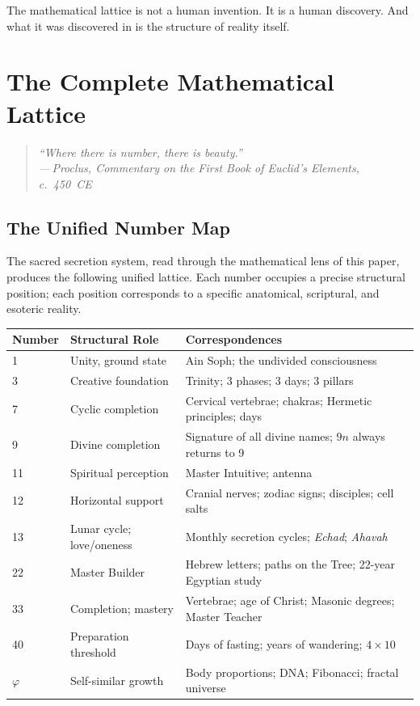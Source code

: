 \documentclass[12pt, a4paper]{article}
\newcommand{\epigraph}[2]{%
  \begin{quote}
    \itshape ``#1''\\[0.3em]
    \normalfont\small\hfill ---\,#2
  \end{quote}
}
\begin{document}
The mathematical lattice is not a human invention. It is a human discovery.
And what it was discovered in is the structure of reality itself.

\section{The Complete Mathematical Lattice}
\label{sec:lattice}

\epigraph{Where there is number, there is beauty.}{Proclus, \emph{Commentary
on the First Book of Euclid's Elements}, c.~450~CE}

\subsection{The Unified Number Map}

The sacred secretion system, read through the mathematical lens of this paper,
produces the following unified lattice. Each number occupies a precise
structural position; each position corresponds to a specific anatomical,
scriptural, and esoteric reality.

\begin{center}
\begin{tabular}{C{1.5cm} C{4cm} C{6.5cm}}
\toprule
\textbf{Number} & \textbf{Structural Role} & \textbf{Correspondences} \\
  & Unity, ground state & Ain Soph; the undivided consciousness \\
3  & Creative foundation & Trinity; 3 phases; 3 days; 3 pillars \\
7  & Cyclic completion & Cervical vertebrae; chakras; Hermetic principles; days \\
9  & Divine completion & Signature of all divine names; $9n$ always returns to 9 \\
11 & Spiritual perception & Master Intuitive; antenna \\
12 & Horizontal support & Cranial nerves; zodiac signs; disciples; cell salts \\
13 & Lunar cycle; love/oneness & Monthly secretion cycles; \emph{Echad}; \emph{Ahavah} \\
22 & Master Builder & Hebrew letters; paths on the Tree; 22-year Egyptian study \\
33 & Completion; mastery & Vertebrae; age of Christ; Masonic degrees; Master Teacher \\
40 & Preparation threshold & Days of fasting; years of wandering; $4 \times 10$ \\
$\varphi$ & Self-similar growth & Body proportions; DNA; Fibonacci; fractal universe \\
\bottomrule
\end{tabular}
\end{center}
\end{document}
